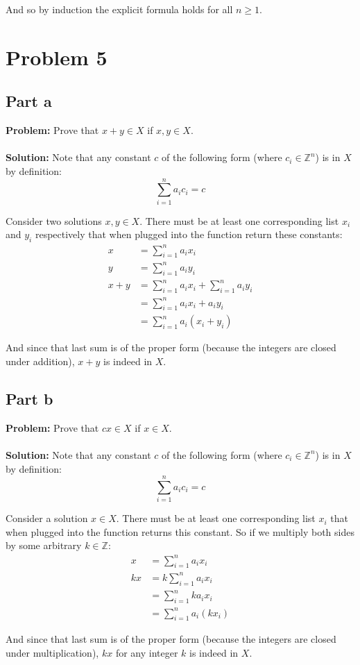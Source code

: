 \documentclass{article}
\begin{document}
And so by induction the explicit formula holds for all $n\ge 1$.

\section*{Problem 5}
\subsection*{Part a}
\textbf{Problem:} Prove that $x+y\in X$ if $x,y\in X$.
\\\\
\textbf{Solution:} Note that any constant $c$ of the following form (where $c_i\in\mathbb Z^n$) is in $X$ by definition:
$$\sum_{i=1}^na_ic_i=c$$

Consider two solutions $x,y\in X$. There must be at least one corresponding list $x_i$ and $y_i$ respectively that when plugged into the function return these constants:
\begin{align*}
  x&=\sum_{i=1}^na_ix_i\\
  y&=\sum_{i=1}^na_iy_i\\
  x+y&=\sum_{i=1}^na_ix_i+\sum_{i=1}^na_iy_i\\
  &=\sum_{i=1}^na_ix_i+a_iy_i\\
  &=\sum_{i=1}^na_i(x_i+y_i)
\end{align*}

And since that last sum is of the proper form (because the integers are closed under addition), $x+y$ is indeed in $X$.

\subsection*{Part b}
\textbf{Problem:} Prove that $cx\in X$ if $x\in X$.
\\\\
\textbf{Solution:} Note that any constant $c$ of the following form (where $c_i\in\mathbb Z^n$) is in $X$ by definition:
$$\sum_{i=1}^na_ic_i=c$$

Consider a solution $x\in X$. There must be at least one corresponding list $x_i$ that when plugged into the function returns this constant. So if we multiply both sides by some arbitrary $k\in\mathbb Z$:
\begin{align*}
  x&=\sum_{i=1}^na_ix_i\\
  kx&=k\sum_{i=1}^na_ix_i\\
  &=\sum_{i=1}^nka_ix_i\\
  &=\sum_{i=1}^na_i(kx_i)
\end{align*}

And since that last sum is of the proper form (because the integers are closed under multiplication), $kx$ for any integer $k$ is indeed in $X$.
\begin{align*}

\end{align*}
\end{document}
